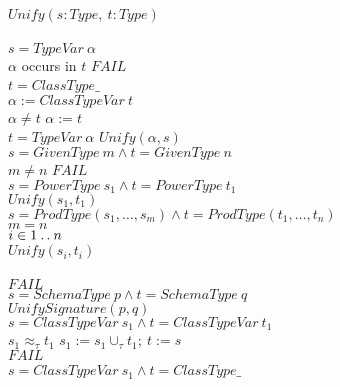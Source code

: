 \begin{figure}[!t]
\begin{tabbing}
$Unify(s : Type,~t : Type)$\\
\nexti\TBEGIN\\
\nexti\nexti\TIF $s = TypeVar~\alpha$ \TTHEN\\
\nexti\nexti\nexti\TIF $\alpha$ occurs in $t$ \TTHEN $FAIL$\\
\nexti\nexti\nexti\TELSE\TIF $t = ClassType \mathrel{\_}$~  \TTHEN\\
\nexti\nexti\nexti\nexti $\alpha := ClassTypeVar~t$\\
\nexti\nexti\nexti\TELSE\TIF $\alpha \neq t$ \TTHEN $\alpha := t$\\
\nexti\nexti\TELSE\TIF $t = TypeVar~\alpha$ \TTHEN $Unify(\alpha, s)$\\
\nexti\nexti\TELSE\TIF $s = GivenType~m \land t = GivenType~n$ \TTHEN\\
\nexti\nexti\nexti\TIF $m \neq n$ \TTHEN $FAIL$\\
\nexti\nexti\TELSE\TIF $s = PowerType~s_1 \land t = PowerType~t_1$ \TTHEN\\
\nexti\nexti\nexti $Unify(s_1, t_1)$\\
\nexti\nexti\TELSE\TIF $s = ProdType(s_1, \ldots, s_m) \land t = ProdType(t_1, \ldots, t_n)$ \TTHEN\\
\nexti\nexti\nexti\TIF $m = n$ \TTHEN\\
\nexti\nexti\nexti\nexti\TFOR $i \in 1 \mathbin{\mathstrut{\ldotp\ldotp}} n$ \TDO\\
\nexti\nexti\nexti\nexti\nexti$Unify(s_i, t_i)$\\
\nexti\nexti\nexti\nexti\TEND\\
\nexti\nexti\nexti\TELSE $FAIL$\\
\nexti\nexti\TELSE\TIF $s = SchemaType~p \land t = SchemaType~q$ \TTHEN\\
\nexti\nexti\nexti $UnifySignature(p, q)$\\
\nexti\nexti\TELSE\TIF $s = ClassTypeVar~s_1 \land t =
ClassTypeVar~t_1$ \TTHEN\\
\nexti\nexti\nexti \TIF $s_1 \approx_{\tau} t_1$ \TTHEN%
 $s_1 := s_1 \cup_{\tau} t_1;~ t := s$\\
\nexti\nexti\nexti \TELSE $FAIL$\\
\nexti\nexti\TELSE\TIF $s = ClassTypeVar~s_1 \land t =
ClassType\mathrel{\_}$~~\TTHEN\\

\end{tabbing}
\end{figure}
